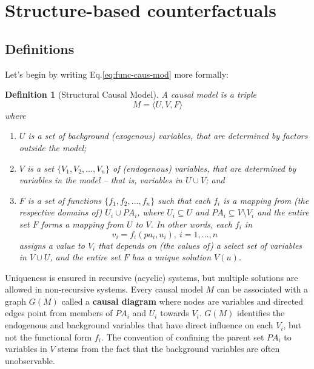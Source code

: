 \documentclass[11pt]{article}
\numberwithin{equation}{section}
\newtheorem{defn}{Definition}[section]
\begin{document}
\section{Structure-based counterfactuals}
\subsection{Definitions}
Let's begin by writing Eq.\eqref{eq:func-caus-mod} more formally:

\begin{defn}[Structural Causal Model] \label{defn:struct-causal-model}
A causal model is a triple
\begin{equation}
M = \langle U, V, F \rangle \nonumber
\end{equation}
where
\begin{enumerate}[noitemsep]
\item $U$ is a set of background (exogenous) variables, that are determined by factors outside the model;
\item $V$ is a set $\{V_1, V_2,..., V_n \}$ of (endogenous) variables, that are determined by variables in the model -- that is, variables in $U \cup V$; and
\item $F$ is a set of functions $\{f_1, f_2,...,f_n \}$ such that each $f_i$ is a mapping from (the respective domains of) $U_i \cup PA_i$, where $U_i \subseteq U$ and $PA_i \subseteq V \setminus V_i$ and the entire set $F$ forms a mapping from $U$ to $V$. In other words, each $f_i$ in
\begin{equation}
v_i = f_i(pa_i, u_i), \ i=1,...,n \nonumber
\end{equation}
assigns a value to $V_i$ that depends on (the values of) a select set of variables in $V \cup U$, and the entire set $F$ has a unique solution $V(u)$.
\end{enumerate}
\end{defn}

Uniqueness is ensured in recursive (acyclic) systems, but multiple solutions are allowed in non-recursive systems. Every causal model $M$ can be associated with a graph $G(M)$ called a \textbf{causal diagram} where nodes are variables and directed edges point from members of $PA_i$ and $U_i$ towards $V_i$. $G(M)$ identifies the endogenous and background variables that have direct influence on each $V_i$, but not the functional form $f_i$. The convention of confining the parent set $PA_i$ to variables in $V$ stems from the fact that the background variables are often unobservable.
\end{document}
